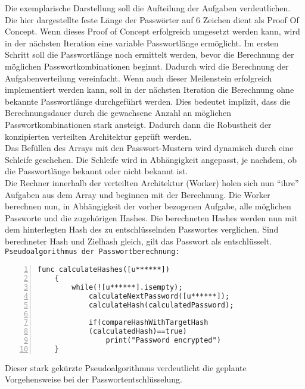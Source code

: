 Die exemplarische Darstellung soll die Aufteilung der Aufgaben verdeutlichen. Die hier dargestellte feste Länge der Passwörter auf 6 Zeichen dient als Proof Of Concept. Wenn dieses Proof of Concept erfolgreich umgesetzt werden kann, wird in der nächsten Iteration eine variable Passwortlänge ermöglicht. Im ersten Schritt soll die Passwortlänge noch ermittelt werden, bevor die Berechnung der möglichen Passwortkombinationen beginnt. Dadurch wird die Berechnung der Aufgabenverteilung vereinfacht. Wenn auch dieser Meilenstein erfolgreich implementiert werden kann, soll in der nächsten Iteration die Berechnung ohne bekannte Passwortlänge durchgeführt werden. Dies bedeutet implizit, dass die Berechnungsdauer durch die gewachsene Anzahl an möglichen Passwortkombinationen stark ansteigt. Dadurch dann die Robustheit der konzipierten verteilten Architektur geprüft werden. \\

Das Befüllen des Arrays mit den Passwort-Mustern wird dynamisch durch eine Schleife geschehen. Die Schleife wird in Abhängigkeit angepasst, je nachdem, ob die Passwortlänge bekannt oder nicht bekannt ist. \\
Die Rechner innerhalb der verteilten Architektur (Worker) holen sich nun \enquote{ihre} Aufgaben aus dem Array und beginnen mit der Berechnung. Die Worker berechnen nun, in Abhängigkeit der vorher bezogenen Aufgabe, alle möglichen Passworte und die zugehörigen Hashes. Die berechneten Hashes werden nun mit dem hinterlegten Hash des zu entschlüsselnden Passwortes verglichen. Sind berechneter Hash und Zielhash gleich, gilt das Passwort als entschlüsselt. \\

\texttt{Pseudoalgorithmus der Passwortberechnung:}
\begin{lstlisting}[basicstyle=\ttfamily,numbers=left,numberstyle=\footnotesize\ttfamily,backgroundcolor=\color{sourcegray}]
	func calculateHashes([u******])
	{
		while(![u******].isempty);
			calculateNextPassword([u******]);
			calculateHash(calculatedPassword);
						
			if(compareHashWithTargetHash
			(calculatedHash)==true)
				print("Password encrypted")
	}
\end{lstlisting}

Dieser stark gekürzte Pseudoalgorithmus verdeutlicht die geplante Vorgehensweise bei der Passwortentschlüsselung. \\


